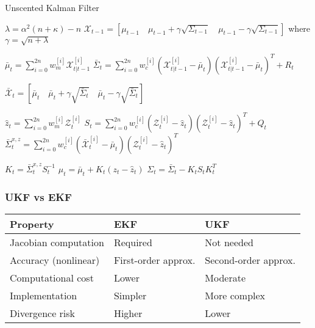 \begin{algorithm}[H]
\caption{Unscented Kalman Filter}

\BlankLine
{}
$\lambda = \alpha^2(n+\kappa) - n$\;
$\mathcal{X}_{t-1} = [\mu_{t-1} \quad \mu_{t-1} + \gamma\sqrt{\Sigma_{t-1}} \quad \mu_{t-1} - \gamma\sqrt{\Sigma_{t-1}}]$ where $\gamma = \sqrt{n + \lambda}$\;

\BlankLine
{}

\BlankLine
{}
$\bar{\mu}_t = \sum_{i=0}^{2n} w_m^{[i]} \mathcal{X}_{t|t-1}^{[i]}$\;
$\bar{\Sigma}_t = \sum_{i=0}^{2n} w_c^{[i]} (\mathcal{X}_{t|t-1}^{[i]} - \bar{\mu}_t)(\mathcal{X}_{t|t-1}^{[i]} - \bar{\mu}_t)^T + R_t$\;

\BlankLine
{}
$\bar{\mathcal{X}}_t = [\bar{\mu}_t \quad \bar{\mu}_t + \gamma\sqrt{\bar{\Sigma}_t} \quad \bar{\mu}_t - \gamma\sqrt{\bar{\Sigma}_t}]$\;

\BlankLine
{}

\BlankLine
{}
$\hat{z}_t = \sum_{i=0}^{2n} w_m^{[i]} \mathcal{Z}_t^{[i]}$\;
$S_t = \sum_{i=0}^{2n} w_c^{[i]} (\mathcal{Z}_t^{[i]} - \hat{z}_t)(\mathcal{Z}_t^{[i]} - \hat{z}_t)^T + Q_t$\;
$\bar{\Sigma}_t^{x,z} = \sum_{i=0}^{2n} w_c^{[i]} (\bar{\mathcal{X}}_t^{[i]} - \bar{\mu}_t)(\mathcal{Z}_t^{[i]} - \hat{z}_t)^T$\;

\BlankLine
{}
$K_t = \bar{\Sigma}_t^{x,z} S_t^{-1}$\;
$\mu_t = \bar{\mu}_t + K_t(z_t - \hat{z}_t)$\;
$\Sigma_t = \bar{\Sigma}_t - K_t S_t K_t^T$\;

\BlankLine
{}
\end{algorithm}

\subsubsection{UKF vs EKF}

\begin{tabular}{|l|l|l|}
\hline
\textbf{Property} & \textbf{EKF} & \textbf{UKF} \\
\hline
Jacobian computation & Required & Not needed \\
Accuracy (nonlinear) & First-order approx. & Second-order approx. \\
Computational cost & Lower & Moderate \\
Implementation & Simpler & More complex \\
Divergence risk & Higher & Lower \\
\hline
\end{tabular}

